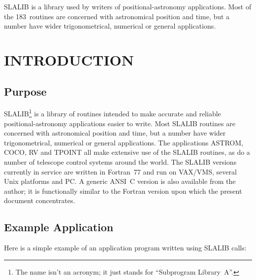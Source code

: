 \documentclass[11pt,twoside]{article}
\newcommand{\stardocinitials}  {SUN}
\newcommand{\stardocnumber}    {67.45}
\newcommand{\stardocname}{\stardocinitials /\stardocnumber}
\newenvironment{latexonly}{}{}
\newcommand{\latexonlytoc}[0]{\tableofcontents}
\newcommand{\nroutines} {183}
\renewcommand{\thepage}{\roman{page}}
\begin{document}
SLALIB is a library used by writers of positional-astronomy applications.
Most of the \nroutines\ routines are concerned with astronomical position and time,
but a number have wider trigonometrical, numerical or general applications.
 \newpage
 \begin{latexonly}
   \setlength{\parskip}{0mm}
   \latexonlytoc
   \setlength{\parskip}{\medskipamount}
   \markright{\stardocname}
 \end{latexonly}
\newpage
\renewcommand{\thepage}{\arabic{page}}
\setcounter{page}{1}

\section{INTRODUCTION}
\subsection{Purpose}
SLALIB\footnote{The name isn't an acronym;
it just stands for ``Subprogram Library~A''.}
is a library of routines
intended to make accurate and reliable positional-astronomy
applications easier to write.
Most SLALIB routines are concerned with astronomical position and time, but a
number have wider trigonometrical, numerical or general applications.
The applications ASTROM, COCO, RV and TPOINT
all make extensive use of the SLALIB
routines, as do a number of telescope control systems around the world.
The SLALIB versions currently in service are written in
Fortran~77 and run on VAX/VMS, several Unix platforms and PC.
A generic ANSI~C version is also available from the author;  it is
functionally similar to the Fortran version upon which the present
document concentrates.

\subsection{Example Application}
Here is a simple example of an application program written
using SLALIB calls:
\end{document}
